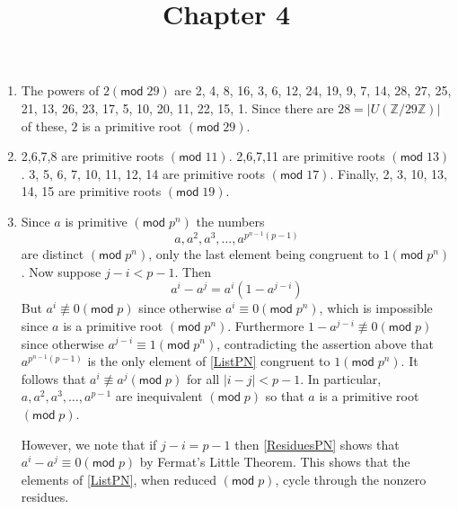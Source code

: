 \documentclass[12pt]{article}
\title{Chapter 4}
\author{}\date{}
\renewcommand{\pmod}[1]{\left(\mathsf{mod}\;#1\right)}
\begin{document}
\maketitle
\thispagestyle{empty}

\begin{enumerate}
\item %
The powers of $2\pmod{29}$ are
2, 4, 8, 16, 3, 6, 12, 24, 19, 9,
7, 14, 28, 27, 25, 21, 13, 26, 23, 17, 5, 10, 20, 11, 22, 15, 1.
Since there are $28=\left|U\left(\mathbb{Z}/29\mathbb{Z}\right)\right|$
of these, $2$ is a primitive root $\pmod{29}$.

\item %
2,6,7,8 are primitive roots $\pmod{11}$.
2,6,7,11 are primitive roots $\pmod{13}$.
3, 5, 6, 7, 10, 11, 12, 14 are primitive roots $\pmod{17}$.
Finally, 2, 3, 10, 13, 14, 15 are primitive roots $\pmod{19}$.

\item %
Since $a$ is primitive $\pmod{p^n}$ the numbers
\begin{equation}\label{ListPN}
a,a^2,a^3,\ldots,a^{p^{n-1}\left(p-1\right)}
\end{equation}
are distinct $\pmod{p^n}$, only the last element being
congruent to $1\pmod{p^n}$.
Now suppose $j-i<p-1$. Then
\begin{equation}\label{ResiduesPN}
a^i-a^j=a^i\left(1-a^{j-i}\right)
\end{equation}
But $a^i\not\equiv 0\pmod{p}$
since otherwise $a^i\equiv 0\pmod{p^n}$, which is impossible
since $a$ is a primitive root $\pmod{p^n}$.
Furthermore $1-a^{j-i}\not\equiv 0\pmod{p}$ since otherwise
$a^{j-i}\equiv 1\pmod{p^n}$, contradicting the assertion
above that
$a^{p^{n-1}\left(p-1\right)}$ is the only element of
\autoref{ListPN} congruent to $1\pmod{p^n}$.
It follows that $a^i\not\equiv a^j\pmod{p}$ for all
$\left|i-j\right|<p-1$. In particular, $a,a^2,a^3,\ldots,a^{p-1}$
are inequivalent $\pmod{p}$ so that $a$ is a primitive root
$\pmod{p}$.

However, we note that if $j-i=p-1$ then \autoref{ResiduesPN}
shows that $a^i-a^j\equiv 0\pmod{p}$ by Fermat's Little Theorem.
This shows that the elements of \autoref{ListPN}, when reduced
$\pmod{p}$, cycle through the nonzero residues.
\end{enumerate}
\end{document}
